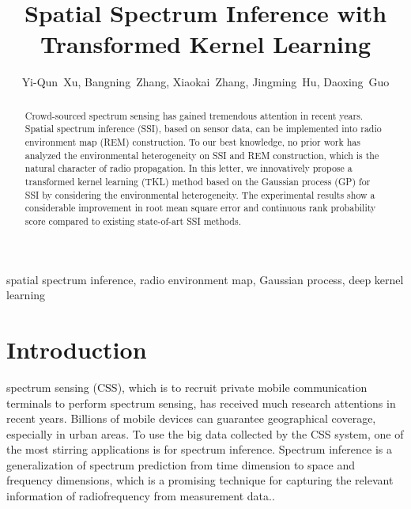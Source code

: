 \documentclass[12pt, draftclsenofoot, oneside, onecolumn]{IEEEtran}
\date{}
\title{Spatial Spectrum Inference with Transformed Kernel Learning}
\begin{document}
\author{
  Yi-Qun~Xu,
  Bangning~Zhang, %
  Xiaokai~Zhang, 
  Jingming~Hu, 
  Daoxing~Guo%

}


\maketitle

\begin{abstract}
Crowd-sourced spectrum sensing has gained tremendous attention in recent years. Spatial spectrum inference (SSI), based on sensor data, can be implemented into radio environment map (REM) construction. To our best knowledge, no prior work has analyzed the environmental heterogeneity on SSI and REM construction, which is the natural character of radio propagation. In this letter, we innovatively propose a transformed kernel learning (TKL) method based on the Gaussian process (GP) for SSI by considering the environmental heterogeneity. The experimental results show a considerable improvement in root mean square error and continuous rank probability score compared to existing state-of-art SSI methods.
\end{abstract}

\begin{IEEEkeywords}
  spatial spectrum inference, radio environment map, Gaussian process, deep kernel learning
\end{IEEEkeywords}

\section{Introduction}
 spectrum sensing (CSS), which is to recruit private mobile communication terminals to perform spectrum sensing, has received much research attentions \cite{Ding2014, Jin2018, Han2019, Hu2020, Amin2020} in recent years. Billions of mobile devices can guarantee geographical coverage, especially in urban areas. To use the big data collected by the CSS system, one of the most stirring applications is for spectrum inference. Spectrum inference is a generalization of spectrum prediction from time dimension to space and frequency dimensions, which is a promising technique for capturing the relevant information of radiofrequency from measurement data.\cite{Ding2018}.
\end{document}
